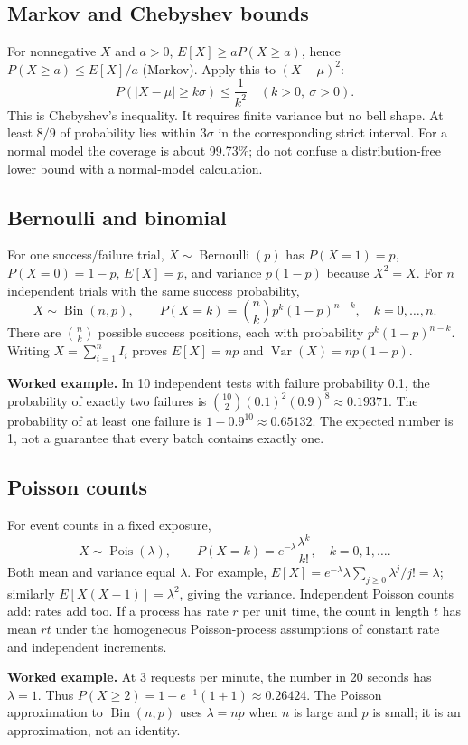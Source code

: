 \subsection{Markov and Chebyshev bounds}
For nonnegative $X$ and $a>0$, $E[X]\geq aP(X\geq a)$, hence
$P(X\geq a)\leq E[X]/a$ (Markov). Apply this to $(X-\mu)^2$:
\[
P(|X-\mu|\geq k\sigma)\leq\frac1{k^2}\quad(k>0,\ \sigma>0).
\]
This is Chebyshev's inequality. It requires finite variance but no bell
shape. At least $8/9$ of probability lies within $3\sigma$ in the corresponding
strict interval. For a normal model the coverage is about 99.73\%; do not
confuse a distribution-free lower bound with a normal-model calculation.

\subsection{Bernoulli and binomial}
For one success/failure trial, $X\sim\operatorname{Bernoulli}(p)$ has
$P(X=1)=p$, $P(X=0)=1-p$, $E[X]=p$, and variance $p(1-p)$ because $X^2=X$.
For $n$ independent trials with the same success probability,
\[
X\sim\operatorname{Bin}(n,p),\qquad
P(X=k)=\binom nk p^k(1-p)^{n-k},\quad k=0,\ldots,n.
\]
There are $\binom nk$ possible success positions, each with probability
$p^k(1-p)^{n-k}$. Writing $X=\sum_{i=1}^n I_i$ proves
$E[X]=np$ and $\operatorname{Var}(X)=np(1-p)$.

\textbf{Worked example.} In 10 independent tests with failure probability
0.1, the probability of exactly two failures is
$\binom{10}2(0.1)^2(0.9)^8\approx0.19371$. The probability of at least one
failure is $1-0.9^{10}\approx0.65132$. The expected number is 1, not a
guarantee that every batch contains exactly one.

\subsection{Poisson counts}
For event counts in a fixed exposure,
\[
X\sim\operatorname{Pois}(\lambda),\qquad
P(X=k)=e^{-\lambda}\frac{\lambda^k}{k!},\quad k=0,1,\ldots.
\]
Both mean and variance equal $\lambda$. For example,
$E[X]=e^{-\lambda}\lambda\sum_{j\geq0}\lambda^j/j!=\lambda$;
similarly $E[X(X-1)]=\lambda^2$, giving the variance.
Independent Poisson counts add: rates add too. If a process has rate $r$
per unit time, the count in length $t$ has mean $rt$ under the homogeneous
Poisson-process assumptions of constant rate and independent increments.

\textbf{Worked example.} At 3 requests per minute, the number in 20 seconds
has $\lambda=1$. Thus $P(X\geq2)=1-e^{-1}(1+1)\approx0.26424$.
The Poisson approximation to $\operatorname{Bin}(n,p)$ uses $\lambda=np$
when $n$ is large and $p$ is small; it is an approximation, not an identity.

